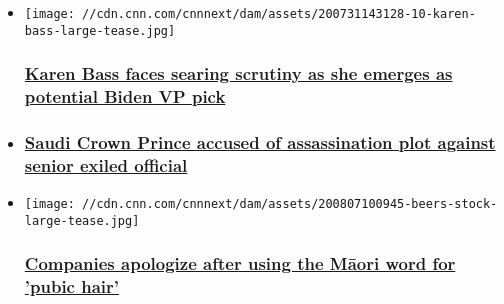 \begin{itemize}
\item
  \href{/2020/08/07/politics/karen-bass-scrutiny-biden-vice-presidential-pick/index.html}{}

  \texttt{[image: //cdn.cnn.com/cnnnext/dam/assets/200731143128-10-karen-bass-large-tease.jpg]}

  \hypertarget{karen-bass-faces-searing-scrutiny-as-she-emerges-as-potential-biden-vp-pick}{%
  \subsubsection{\texorpdfstring{\href{/2020/08/07/politics/karen-bass-scrutiny-biden-vice-presidential-pick/index.html}{Karen
  Bass faces searing scrutiny as she emerges as potential Biden VP
  pick}}{Karen Bass faces searing scrutiny as she emerges as potential Biden VP pick}}\label{karen-bass-faces-searing-scrutiny-as-she-emerges-as-potential-biden-vp-pick}}
\item
  \hypertarget{saudi-crown-prince-accused-of-assassination-plot-against-senior-exiled-official}{%
  \subsubsection{\texorpdfstring{\href{/2020/08/06/politics/saudi-assassination-plot-allegations/index.html}{Saudi
  Crown Prince accused of assassination plot against senior exiled
  official}}{Saudi Crown Prince accused of assassination plot against senior exiled official}}\label{saudi-crown-prince-accused-of-assassination-plot-against-senior-exiled-official}}
\end{itemize}

\begin{itemize}
\item
  \href{/travel/article/brands-mori-named-pubic-hair-scli-intl/index.html}{}

  \texttt{[image: //cdn.cnn.com/cnnnext/dam/assets/200807100945-beers-stock-large-tease.jpg]}

  \hypertarget{companies-apologize-after-using-the-mux101ori-word-for-pubic-hair}{%
  \subsubsection{\texorpdfstring{\href{/travel/article/brands-mori-named-pubic-hair-scli-intl/index.html}{Companies
  apologize after using the Māori word for 'pubic
  hair'}}{Companies apologize after using the Māori word for 'pubic hair'}}\label{companies-apologize-after-using-the-mux101ori-word-for-pubic-hair}}
\end{itemize}

